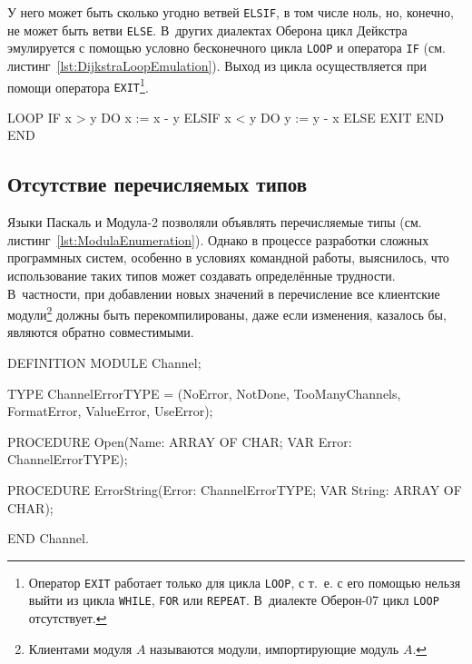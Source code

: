 \documentclass[utf8]{lgu}
\newcommand{\code}[1]{{\normalsize\texttt{#1}}}
\begin{document}
У него может быть сколько угодно ветвей \code{ELSIF}, в том числе ноль, но, конечно, не может быть ветви \code{ELSE}. В~других диалектах Оберона цикл Дейкстра эмулируется с помощью условно бесконечного цикла \code{LOOP} и оператора \code{IF} (см. листинг~\ref{lst:DijkstraLoopEmulation}). Выход из цикла осуществляется при помощи оператора \code{EXIT}\footnote{Оператор \code{EXIT} работает только для цикла \code{LOOP}, с т.~е. с его помощью нельзя выйти из цикла \code{WHILE}, \code{FOR} или \code{REPEAT}. В~диалекте Оберон-07 цикл \code{LOOP} отсутствует.}.

\begin{listing}[H]
\caption{Эмуляция цикла Дейкстры через цикл LOOP}
\vspace{-17pt}
\label{lst:DijkstraLoopEmulation}
\begin{modula2}
LOOP IF x > y DO
  x := x - y
ELSIF x < y DO
  y := y - x
ELSE EXIT END END
\end{modula2}
\end{listing}

\subsection{Отсутствие перечисляемых типов}

\firstparskip Языки Паскаль и Модула‑2 позволяли объявлять перечисляемые типы (см. листинг~\ref{lst:ModulaEnumeration}). Однако в процессе разработки сложных программных систем, особенно в условиях командной работы, выяснилось, что использование таких типов может создавать определённые трудности. В~частности, при добавлении новых значений в перечисление все клиентские модули\footnote{Клиентами модуля $A$ называются модули, импортирующие модуль $A$.} должны быть перекомпилированы, даже если изменения, казалось бы, являются обратно совместимыми.

\begin{listing}[H]
\caption{Перечисляемый тип в языке Модула‑2}
\vspace{-17pt}
\label{lst:ModulaEnumeration}
\begin{modula2}
DEFINITION MODULE Channel;

  TYPE
    ChannelErrorTYPE =
      (NoError,
       NotDone,
       TooManyChannels,
       FormatError,
       ValueError,
       UseError);

  PROCEDURE Open(Name: ARRAY OF CHAR; VAR Error: ChannelErrorTYPE);

  PROCEDURE ErrorString(Error: ChannelErrorTYPE;
                           VAR String: ARRAY OF CHAR);

END Channel.
\end{modula2}
\end{listing}
\end{document}
